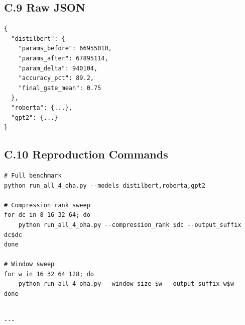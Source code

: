 \subsection{C.9 Raw JSON}

\begin{lstlisting}
{
  "distilbert": {
    "params_before": 66955010,
    "params_after": 67895114,
    "param_delta": 940104,
    "accuracy_pct": 89.2,
    "final_gate_mean": 0.75
  },
  "roberta": {...},
  "gpt2": {...}
}
\end{lstlisting}

\subsection{C.10 Reproduction Commands}

\begin{lstlisting}
# Full benchmark
python run_all_4_oha.py --models distilbert,roberta,gpt2

# Compression rank sweep
for dc in 8 16 32 64; do
    python run_all_4_oha.py --compression_rank $dc --output_suffix dc$dc
done

# Window sweep
for w in 16 32 64 128; do
    python run_all_4_oha.py --window_size $w --output_suffix w$w
done
\end{lstlisting}
\begin{lstlisting}

---
\end{lstlisting}